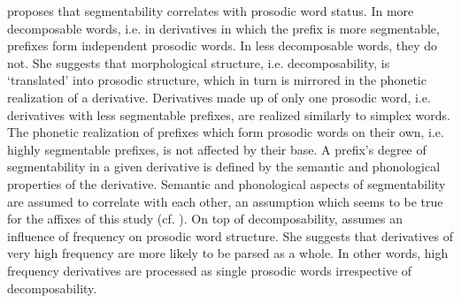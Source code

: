 \cite{Raffelsiefen.1999} proposes that segmentability correlates with prosodic word status. In more decomposable words, i.e. in derivatives in which the prefix is more segmentable, prefixes form independent prosodic words. In less decomposable words, they do not.
She suggests that morphological structure, i.e. decomposability, is `translated' into prosodic structure, which in turn is mirrored in the phonetic realization of a derivative. Derivatives made up of only one prosodic word, i.e. derivatives with less segmentable prefixes, are realized similarly to simplex words. The phonetic realization of prefixes which form prosodic words on their own, i.e. highly segmentable prefixes, is not affected by their base. 
A prefix's degree of segmentability in a given derivative is defined by the semantic and phonological properties of the derivative. 
Semantic and phonological aspects of segmentability are assumed to correlate with each other, an assumption which seems to be true for the affixes of this study (cf. ). On top of decomposability, \citet[175 f.]{Raffelsiefen.1999} assumes an influence of frequency on prosodic word structure. %
She suggests that derivatives of very high frequency are more likely to be parsed as a whole. In other words, high frequency derivatives are processed as single prosodic words irrespective of decomposability.






